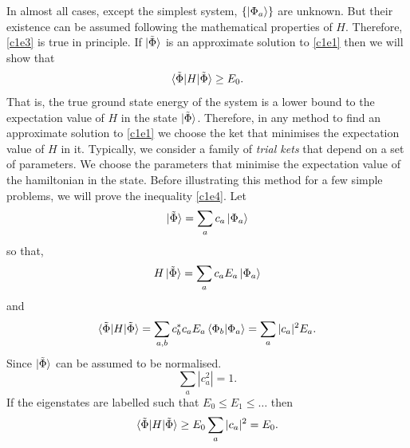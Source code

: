 In almost all cases, except the simplest system, $\{\ket{\Phi_a}\}$ are unknown.
But their existence can be assumed following the mathematical properties of
$H$. Therefore, \ref{c1e3} is true in principle. If $\ket{\tilde{\Phi}}$
is an approximate solution to \eqref{c1e1} then we will show that
\begin{equation}\label{c1e4}
\braket{\tilde{\Phi}|H|\tilde{\Phi}} \ge E_0.
\end{equation}
That is, the true ground state energy of the system is a lower bound to the
expectation value of $H$ in the state $\ket{\tilde{\Phi}}$. Therefore, in
any method to find an approximate solution to \eqref{c1e1} we choose the ket
that minimises the expectation value of $H$ in it. Typically, we consider
a family of \emph{trial kets} that depend on a set of parameters. We choose the
parameters that minimise the expectation value of the hamiltonian in the state.
Before illustrating this method for a few simple problems, we will prove the
inequality \eqref{c1e4}. Let
\begin{equation}\label{c1e5}
\ket{\tilde{\Phi}} = \sum_a c_a\ket{\Phi_a}
\end{equation}
so that,
\[
H\ket{\tilde{\Phi}} = \sum_a c_aE_a\ket{\Phi_a}
\]
and
\begin{equation}\label{c1e6}
\braket{\tilde{\Phi}|H|\tilde{\Phi}} = \sum_{a,b}c_b^\ast c_aE_a
\braket{\Phi_b|\Phi_a} = \sum_a |c_a|^2E_a.
\end{equation}
Since $\ket{\tilde{\Phi}}$ can be assumed to be normalised. 
\[
\sum_a |c_a^2| = 1.
\]
If the eigenstates are labelled such that $E_0 \le E_1 \le
\ldots$ then
\[
\braket{\tilde{\Phi}|H|\tilde{\Phi}} \ge E_0\sum_a|c_a|^2 =
E_0.
\]

